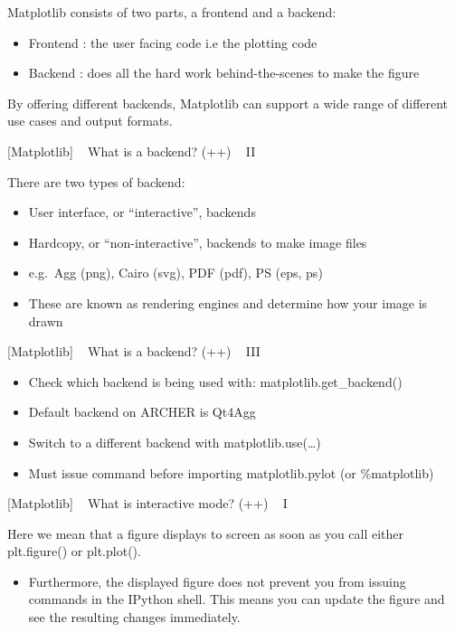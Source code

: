 \documentclass{article}
\begin{document}
Matplotlib consists of two parts, a frontend and a backend:

\begin{itemize}
\itemsep1pt\parskip0pt
\item
  Frontend : the user facing code i.e the plotting code
\item
  Backend : does all the hard work behind-the-scenes to make the figure
\end{itemize}

By offering different backends, Matplotlib can support a wide range of
different use cases and output formats.

    {[}Matplotlib{]} ~ What is a backend? (++) ~ II

There are two types of backend:

\begin{itemize}
\item
  User interface, or ``interactive'', backends
\item
  Hardcopy, or ``non-interactive'', backends to make image files
\item
  e.g.~Agg (png), Cairo (svg), PDF (pdf), PS (eps, ps)
\item
  These are known as rendering engines and determine how your image is
  drawn
\end{itemize}

    {[}Matplotlib{]} ~ What is a backend? (++) ~ III

\begin{itemize}
\item
  Check which backend is being used with: matplotlib.get\_backend()
\item
  Default backend on ARCHER is Qt4Agg
\item
  Switch to a different backend with matplotlib.use(\ldots{})
\item
  Must issue command before importing matplotlib.pylot (or \%matplotlib)
\end{itemize}

    {[}Matplotlib{]} ~ What is interactive mode? (++) ~ I

Here we mean that a figure displays to screen as soon as you call either
plt.figure() or plt.plot().

\begin{itemize}
\itemsep1pt\parskip0pt
\item
  Furthermore, the displayed figure does not prevent you from issuing
  commands in the IPython shell. This means you can update the figure
  and see the resulting changes immediately.
\end{itemize}
\end{document}
